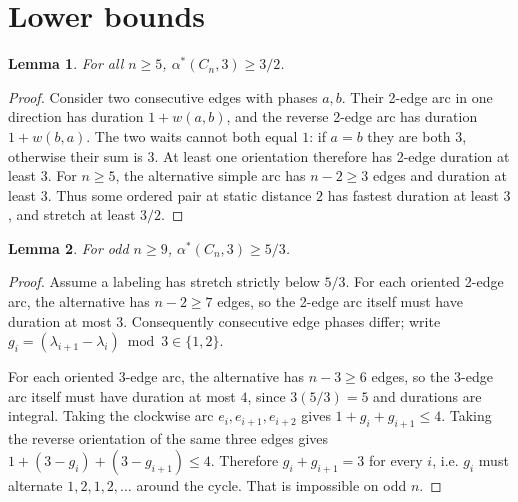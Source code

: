 \documentclass[10pt,a4paper]{article}
\newtheorem{lemma}{Lemma}
\newcommand{\opt}{\alpha^*}
\begin{document}
\section{Lower bounds}
\begin{lemma}\label{lem:lower3/2}
For all $n\ge5$, $\opt(C_n,3)\ge3/2$.
\end{lemma}
\begin{proof}
Consider two consecutive edges with phases $a,b$. Their 2-edge arc in one direction has duration $1+w(a,b)$, and the reverse 2-edge arc has duration $1+w(b,a)$. The two waits cannot both equal $1$: if $a=b$ they are both $3$, otherwise their sum is $3$. At least one orientation therefore has 2-edge duration at least $3$. For $n\ge5$, the alternative simple arc has $n-2\ge3$ edges and duration at least $3$. Thus some ordered pair at static distance $2$ has fastest duration at least $3$, and stretch at least $3/2$.
\end{proof}

\begin{lemma}\label{lem:lowerodd}
For odd $n\ge9$, $\opt(C_n,3)\ge5/3$.
\end{lemma}
\begin{proof}
Assume a labeling has stretch strictly below $5/3$. For each oriented 2-edge arc, the alternative has $n-2\ge7$ edges, so the 2-edge arc itself must have duration at most $3$. Consequently consecutive edge phases differ; write $g_i=(\lambda_{i+1}-\lambda_i)\bmod3\in\{1,2\}$.

For each oriented 3-edge arc, the alternative has $n-3\ge6$ edges, so the 3-edge arc itself must have duration at most $4$, since $3(5/3)=5$ and durations are integral. Taking the clockwise arc $e_i,e_{i+1},e_{i+2}$ gives $1+g_i+g_{i+1}\le4$. Taking the reverse orientation of the same three edges gives $1+(3-g_i)+(3-g_{i+1})\le4$. Therefore $g_i+g_{i+1}=3$ for every $i$, i.e. $g_i$ must alternate $1,2,1,2,\ldots$ around the cycle. That is impossible on odd $n$.
\end{proof}
\end{document}
